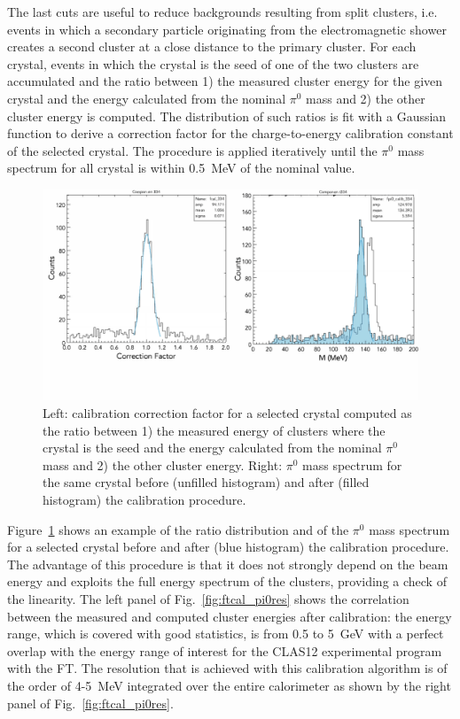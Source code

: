 The last cuts are useful to reduce backgrounds resulting from split clusters, i.e. events in which a secondary particle
originating from the electromagnetic shower creates a second cluster at a close distance to the primary cluster. For
each crystal, events in which the crystal is the seed of one of the two clusters are accumulated and the ratio between
1) the measured cluster energy for the given crystal and the energy calculated from the nominal $\pi^0$ mass and 2)
the other cluster energy is computed. The distribution of such ratios is fit with a Gaussian function to derive a
correction factor for the charge-to-energy calibration constant of the selected crystal. The procedure is applied
iteratively until the $\pi^0$ mass spectrum for all crystal is within 0.5~MeV of the nominal value.

\begin{figure}
\includegraphics[height=0.46\columnwidth]{fig/ftcal_pi0.pdf}
\caption{Left: calibration correction factor for a selected crystal computed as the ratio between 1) the measured
  energy of clusters where the crystal is the seed and the energy calculated from the nominal $\pi^0$ mass and 2)
  the other cluster energy. Right: $\pi^0$ mass spectrum for the same crystal before (unfilled histogram) and after
  (filled histogram) the calibration procedure.}
\label{fig:ftcal_pi0}
\end{figure}

Figure~\ref{fig:ftcal_pi0} shows an example of the ratio distribution and of the $\pi^0$ mass spectrum for a
selected crystal before and after (blue histogram) the calibration procedure. The advantage of this procedure is
that it does not strongly depend on the beam energy and exploits the full energy spectrum of the clusters, providing
a check of the linearity. The left panel of Fig.~\ref{fig:ftcal_pi0res} shows the  correlation between the measured
and computed cluster energies after calibration: the energy range, which is covered with good statistics, is from 0.5
to 5~GeV with a perfect overlap with the energy range of interest for the CLAS12 experimental program with the
FT. The resolution that is achieved with this calibration algorithm is of the order of 4-5~MeV integrated over the
entire calorimeter as shown by the right panel of Fig.~\ref{fig:ftcal_pi0res}.

